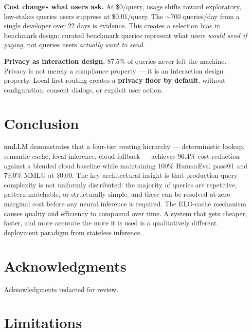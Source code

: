 \documentclass[11pt]{article}
\begin{document}
\textbf{Cost changes what users ask.} At \$0/query, usage shifts toward
exploratory, low-stakes queries users suppress at \$0.01/query. The
$\sim$700 queries/day from a single developer over 22 days is evidence.
This creates a selection bias in benchmark design: curated benchmark
queries represent what users \textit{would send if paying}, not queries
users \textit{actually want to send}.

\textbf{Privacy as interaction design.} 87.5\% of queries never left
the machine. Privacy is not merely a compliance property --- it is an
interaction design property. Local-first routing creates a \textbf{privacy
floor by default}, without configuration, consent dialogs, or explicit
user action.

\section{Conclusion}

muLLM demonstrates that a four-tier routing hierarchy --- deterministic
lookup, semantic cache, local inference, cloud fallback --- achieves
96.4\% cost reduction against a blended cloud baseline while maintaining
100\% HumanEval pass@1 and 79.0\% MMLU at \$0.00. The key architectural
insight is that production query complexity is not uniformly distributed:
the majority of queries are repetitive, pattern-matchable, or
structurally simple, and these can be resolved at zero marginal cost
before any neural inference is required. The ELO-cache mechanism causes
quality and efficiency to compound over time. A system that gets
cheaper, faster, and more accurate the more it is used is a
qualitatively different deployment paradigm from stateless inference.

\section*{Acknowledgments}

Acknowledgments redacted for review.




\section*{Limitations}
\label{sec:limitations}
\end{document}
